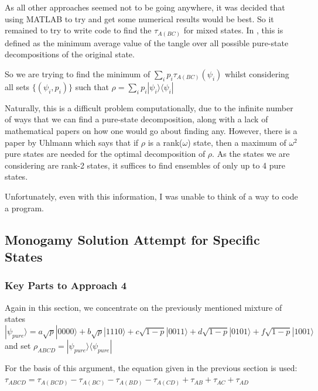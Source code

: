 \documentclass[12pt,a4paper]{article}
\numberwithin{equation}{section}
\begin{document}
As all other approaches seemed not to be going anywhere, it was decided that using MATLAB to try and get some numerical results would be best. So it remained to try to write code to find the $\tau_{A(BC)}$ for mixed states. In \cite{CKW}, this is defined as the minimum average value of the tangle over all possible pure-state decompositions of the original state.

So we are trying to find the minimum of $\sum_{i}p_{i}\tau_{A(BC)}(\psi_{i})$ whilst considering all sets $\{(\psi_{i},p_{i})\}$ such that $\rho = \sum_{i}p_{i}|\psi_{i}\rangle\langle\psi_{i}|$

Naturally, this is a difficult problem computationally, due to the infinite number of ways that we can find a pure-state decomposition, along with a lack of mathematical papers on how one would go about finding any. However, there is a paper by Uhlmann \cite{U} which says that if $\rho$ is a rank($\omega$) state, then a maximum of $\omega^2$ pure states are needed for the optimal decomposition of $\rho$. As the states we are considering are rank-2 states, it suffices to find ensembles of only up to 4 pure states.

Unfortunately, even with this information, I was unable to think of a way to code a program.

\newpage

\subsection{Monogamy Solution Attempt for Specific States}
\label{subsec:fourSolution}

\subsubsection{Key Parts to Approach 4}
\label{subsubsec:keyParts}

Again in this section, we concentrate on the previously mentioned mixture of states $|\psi_{pure}\rangle = a\sqrt{p}|0000\rangle + b\sqrt{p}|1110\rangle + c\sqrt{1-p}|0011\rangle + d\sqrt{1-p}|0101\rangle + f\sqrt{1-p}|1001\rangle$ and set $\rho_{ABCD} = |\psi_{pure}\rangle\langle\psi_{pure}|$

\vskip 2mm

For the basis of this argument, the equation given in the previous section is used: $\tau_{ABCD} = \tau_{A(BCD)} - \tau_{A(BC)} - \tau_{A(BD)} - \tau_{A(CD)} + \tau_{AB} + \tau_{AC} + \tau_{AD}$

\vskip 2mm
\end{document}
